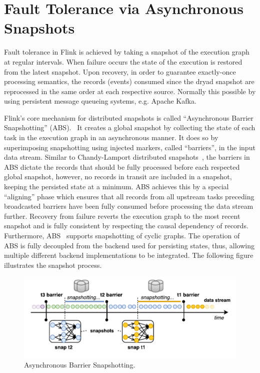 

\section{Fault Tolerance via Asynchronous Snapshots}
\label{sec:snapshots}
Fault tolerance in Flink is achieved by taking a snapshot of the execution graph at regular intervals. When failure occurs the state of the execution is restored from the latest snapshot. Upon recovery, in order to guarantee exactly-once processing semantics, the records (events) consumed since the dryad snapshot are reprocessed in the same order at each respective source. Normally this possible by using persistent message queueing systems, e.g. Apache Kafka.~\cite{CUSTOM:web/Kafka}

Flink's core mechanism for distributed snapshots is called ``Asynchronous Barrier Snapshotting'' (ABS).~\cite{carbone2015lightweight} It creates a global snapshot by collecting the state of each task in the execution graph in an asynchronous manner. It does so by superimposing snapshotting using injected markers, called ``barriers'', in the input data stream. Similar to Chandy-Lamport distributed snapshots~\cite{chandy1985distributed}, the barriers in ABS dictate the records that should be fully processed before each respected global snapshot, however, no records in transit are included in a snapshot, keeping the persisted state at a minimum. ABS achieves this by a special ``aligning'' phase which ensures that all records from all upstream tasks preceding broadcasted barriers have been fully consumed before processing the data stream further. Recovery from failure reverts the execution graph to the most recent snapshot and is fully consistent by respecting the causal dependency of records. Furthermore, ABS~\cite{carbone2015lightweight} supports snapshotting of cyclic graphs.  The operation of ABS is fully decoupled from the backend used for persisting states, thus, allowing multiple different backend implementations to be integrated. The following figure illustrates the snapshot process.

\begin{figure}[h!]
	\centering  	
  	\includegraphics[width=.75\textwidth]{figs/snaps.pdf}
  	\vspace{-4mm}
	\caption{Asynchronous Barrier Snapshotting.}
	\vspace{-2mm}
	\label{fig:FlinkStack}
\end{figure}
